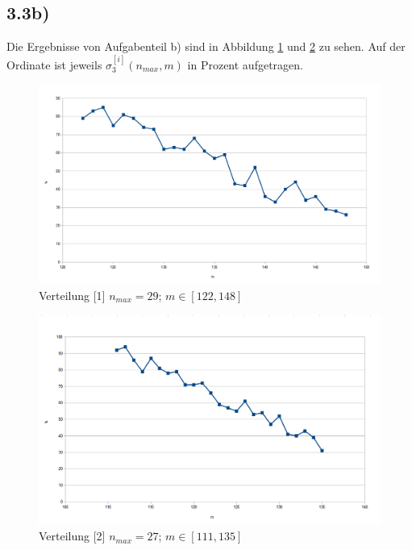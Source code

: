 \documentclass[maincolor=black]{exercise}
\begin{document}
\subsection{3.3b)}
Die Ergebnisse von Aufgabenteil b) sind in Abbildung \ref{fig:b1} und \ref{fig:b2} zu sehen. Auf der Ordinate ist jeweils  $\sigma_3^{[i]}(n_{max},m)$ in Prozent aufgetragen.
\begin{figure}[t]
	\includegraphics[width=\linewidth]{Diagram-A.png}
	\caption{Verteilung [1] $n_{max} = 29$; $m \in [122,148]$\label{fig:b1}}
\end{figure}
\begin{figure}[t]
	\includegraphics[width=\linewidth]{Diagram-B.png}
	\caption{Verteilung [2] $n_{max} = 27$; $m \in [111,135]$\label{fig:b2}}
\end{figure}
\end{document}

